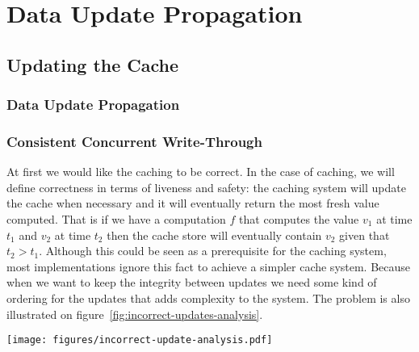\chapter{Data Update Propagation}
\label{chapter:update_propagation}

\section{Updating the Cache}
\label{sec:updating_the_cache}


\subsection{Data Update Propagation}
\label{subsec:data_update_propagation}



\subsection{Consistent Concurrent Write-Through}
\label{subsec:consistent_concurrent_write_through}


At first we would like the caching to be correct. In the case of caching, we will define correctness in terms of liveness and safety: the caching system will update the cache when necessary and it will eventually return the most fresh value computed. That is if we have a computation $f$ that computes the value $v_1$ at time $t_1$ and $v_2$ at time $t_2$ then the cache store will eventually contain $v_2$ given that $t_2 > t_1$. Although this could be seen as a prerequisite for the caching system, most implementations ignore this fact to achieve a simpler cache system. Because when we want to keep the integrity between updates we need some kind of ordering for the updates that adds complexity to the system. The problem is also illustrated on figure~\ref{fig:incorrect-updates-analysis}.

\begin{figure*}[ht!]
  \centering
  \texttt{[image: figures/incorrect-update-analysis.pdf]}
  \caption{Showing how two concurrent caching updates from two different application servers results in an inconsistent state. We see that even though the request from \emph{Web 2} are based on data older than \emph{Web 1} it gets to write }
  \label{fig:incorrect-updates-analysis}
\end{figure*}

